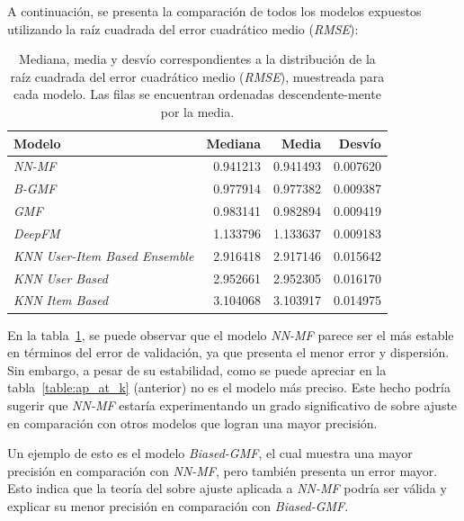 \documentclass[11pt,a4paper,twoside]{thesis}
\begin{document}
\clearpage

A continuación, se presenta la comparación de todos los modelos expuestos
utilizando la raíz cuadrada del error cuadrático medio (\textit{RMSE}):

\begin{table}[!htb]
	\centering
	\footnotesize
	\begin{tabular}{lrrr}
		\hline
		Modelo                                & Mediana  & Media    & Desvío   \\
		\hline
		\textit{NN-MF}                        & 0.941213 & 0.941493 & 0.007620 \\
		\textit{B-GMF}                        & 0.977914 & 0.977382 & 0.009387 \\
		\textit{GMF}                          & 0.983141 & 0.982894 & 0.009419 \\
		\textit{DeepFM}                       & 1.133796 & 1.133637 & 0.009183 \\
		\textit{KNN User-Item Based Ensemble} & 2.916418 & 2.917146 & 0.015642 \\
		\textit{KNN User Based}               & 2.952661 & 2.952305 & 0.016170 \\
		\textit{KNN Item Based}               & 3.104068 & 3.103917 & 0.014975 \\
		\hline
	\end{tabular}
	\caption{
		Mediana, media y desvío correspondientes a la distribución de
		la raíz cuadrada del error cuadrático medio (\textit{RMSE}),
		muestreada para cada modelo. Las filas se encuentran ordenadas
		descendente-mente por la media.
	}
	\label{table:rmse}
\end{table}

En la tabla~\ref{table:rmse}, se puede observar que el modelo \textit{NN-MF}
parece ser el más estable en términos del error de validación, ya que presenta
el menor error y dispersión. Sin embargo, a pesar de su estabilidad, como se
puede apreciar en la tabla~\ref{table:ap_at_k} (anterior) no es el modelo más
preciso. Este hecho podría sugerir que \textit{NN-MF} estaría experimentando un
grado significativo de sobre ajuste en comparación con otros modelos que logran
una mayor precisión.

Un ejemplo de esto es el modelo \textit{Biased-GMF}, el cual muestra una mayor
precisión en comparación con \textit{NN-MF}, pero también presenta un error
mayor. Esto indica que la teoría del sobre ajuste aplicada a \textit{NN-MF}
podría ser válida y explicar su menor precisión en comparación con
\textit{Biased-GMF}.
\end{document}
